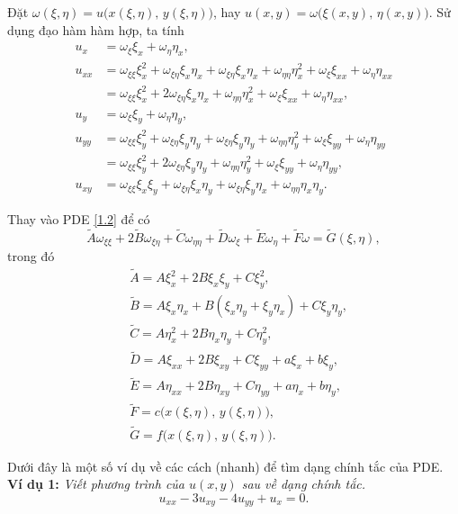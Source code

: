 \documentclass[10pt, a4paper]{article}
\begin{document}
	Đặt $\omega(\xi,\eta)=u\big(x(\xi,\eta),\,y(\xi,\eta)\big)$, hay $u(x,y)=\omega\big(\xi(x,y),\,\eta(x,y)\big)$. Sử dụng đạo hàm hàm hợp, ta tính \begin{align*}
		u_x&=\omega_\xi\xi_x+\omega_\eta\eta_x,\\
		u_{xx}&=\omega_{\xi\xi}\xi_x^2+\omega_{\xi\eta}\xi_x\eta_x+\omega_{\xi\eta}\xi_x\eta_x+\omega_{\eta\eta}\eta_x^2+\omega_\xi\xi_{xx}+\omega_\eta\eta_{xx}\\
		&=\omega_{\xi\xi}\xi_x^2+2\omega_{\xi\eta}\xi_x\eta_x+\omega_{\eta\eta}\eta_x^2+\omega_\xi\xi_{xx}+\omega_\eta\eta_{xx},\\
		u_y&=\omega_\xi\xi_y+\omega_\eta\eta_y,\\
		u_{yy}&=\omega_{\xi\xi}\xi_y^2+\omega_{\xi\eta}\xi_y\eta_y+\omega_{\xi\eta}\xi_y\eta_y+\omega_{\eta\eta}\eta_y^2+\omega_\xi\xi_{yy}+\omega_\eta\eta_{yy}\\
		&=\omega_{\xi\xi}\xi_y^2+2\omega_{\xi\eta}\xi_y\eta_y+\omega_{\eta\eta}\eta_y^2+\omega_\xi\xi_{yy}+\omega_\eta\eta_{yy},\\
		u_{xy}&=\omega_{\xi\xi}\xi_x\xi_y+\omega_{\xi\eta}\xi_x\eta_y+\omega_{\xi\eta}\xi_y\eta_x+\omega_{\eta\eta}\eta_x\eta_y.
	\end{align*}
	
	Thay vào PDE \eqref{1.2} để có $$\widetilde A\omega_{\xi\xi}+2\widetilde B\omega_{\xi\eta}+\widetilde C\omega_{\eta\eta}+\widetilde D\omega_\xi+\widetilde E\omega_\eta+\widetilde F\omega=\widetilde G(\xi,\eta),$$
	trong đó \begin{align*}
		&\widetilde A=A\xi_x^2+2B\xi_x\xi_y+C\xi_y^2,\\
		&\widetilde B=A\xi_x\eta_x+B(\xi_x\eta_y+\xi_y\eta_x)+C\xi_y\eta_y,\\
		&\widetilde C=A\eta_x^2+2B\eta_x\eta_y+C\eta_y^2,\\
		&\widetilde D=A\xi_{xx}+2B\xi_{xy}+C\xi_{yy}+a\xi_x+b\xi_y,\\
		&\widetilde E=A\eta_{xx}+2B\eta_{xy}+C\eta_{yy}+a\eta_x+b\eta_y,\\
		&\widetilde F=c\big(x(\xi,\eta),\,y(\xi,\eta)\big),\\
		&\widetilde G=f\big(x(\xi,\eta),\,y(\xi,\eta)\big).
	\end{align*}
	
	Dưới đây là một số ví dụ về các cách (nhanh) để tìm dạng chính tắc của PDE.\\
	
	\textbf{Ví dụ 1:} \textit{Viết phương trình của $u(x,y)$ sau về dạng chính tắc.} $$u_{xx}-3u_{xy}-4u_{yy}+u_x=0.$$
	
\end{document}

